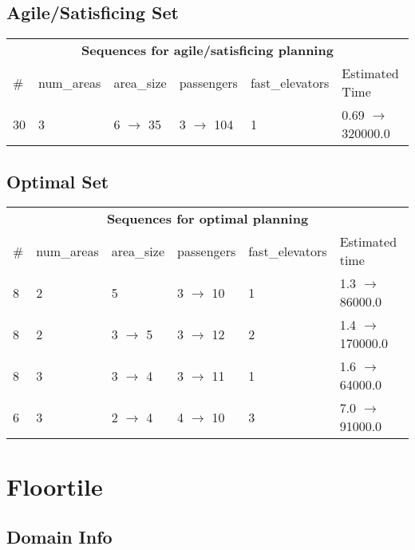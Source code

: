 \documentclass{article}
\begin{document}
                         \subsection*{Agile/Satisficing Set}

                        \begin{center}
                        \begin{tabular}{l|l|l|l|l|l}
                        \multicolumn{6}{c}{\bf \large Sequences for agile/satisficing planning}\\
                        \# & num\_areas & area\_size & passengers & fast\_elevators & Estimated Time\\\midrule
                        30&3&6 $\rightarrow$ 35&3 $\rightarrow$ 104&1&0.69 $\rightarrow$ 320000.0
                        \end{tabular}
                        \end{center}
                    
                            \subsection*{Optimal Set}

                            \begin{center}
                            \begin{tabular}{l|l|l|l|l|l}
                            \multicolumn{6}{c}{\bf \large Sequences for optimal planning}\\
                            \# & num\_areas & area\_size & passengers & fast\_elevators & Estimated time\\\midrule
                            8&2&5&3 $\rightarrow$ 10&1&1.3 $\rightarrow$ 86000.0\\
8&2&3 $\rightarrow$ 5&3 $\rightarrow$ 12&2&1.4 $\rightarrow$ 170000.0\\
8&3&3 $\rightarrow$ 4&3 $\rightarrow$ 11&1&1.6 $\rightarrow$ 64000.0\\
6&3&2 $\rightarrow$ 4&4 $\rightarrow$ 10&3&7.0 $\rightarrow$ 91000.0
                            \end{tabular}
                            \end{center}
                    \newpage \section{Floortile}
                    \subsection*{Domain Info}
\end{document}
